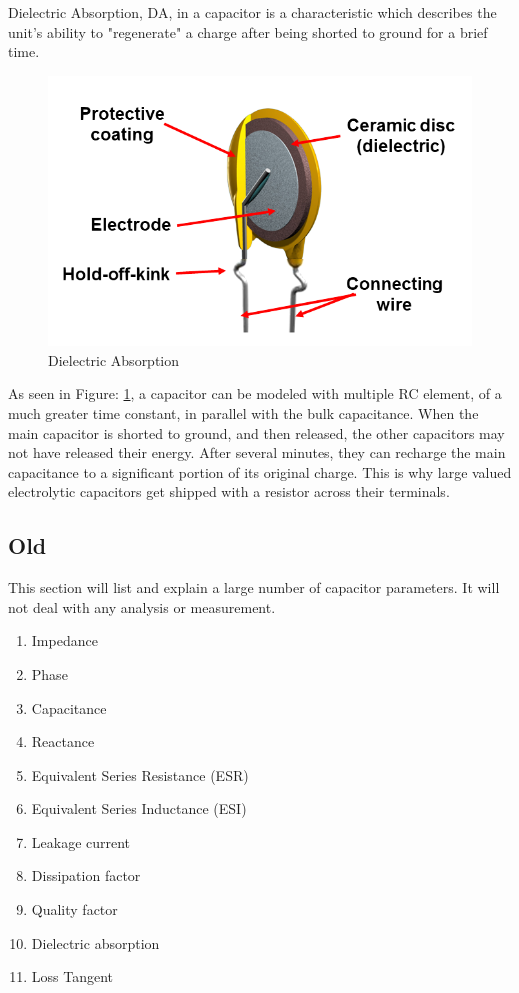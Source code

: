 Dielectric Absorption, DA, in a capacitor is a characteristic which describes the unit's ability to "regenerate" a charge after being shorted to ground for a brief time.

\begin{figure}
    \includegraphics[keepaspectratio=true,scale=.5]{./figures/testImage.png}
    \centering
    \caption{Dielectric Absorption}
    \label{daPlot}
\end{figure}

As seen in Figure: \ref{daPlot}, a capacitor can be modeled with multiple RC element, of a much greater time constant, in parallel with the bulk capacitance. When the main capacitor is shorted to ground, and then released, the other capacitors may not have released their energy. After several minutes, they can recharge the main capacitance to a significant portion of its original charge. This is why large valued electrolytic capacitors get shipped with a resistor across their terminals.

\subsection{Old}

This section will list and explain a large number of capacitor parameters. It will not deal with any analysis or measurement.

\begin {enumerate}
    \item Impedance
    \item Phase
    \item Capacitance
    \item Reactance
    \item Equivalent Series Resistance (ESR)
    \item Equivalent Series Inductance (ESI)
    \item Leakage current
    \item Dissipation factor
    \item Quality factor
    \item Dielectric absorption
    \item Loss Tangent
\end {enumerate}

